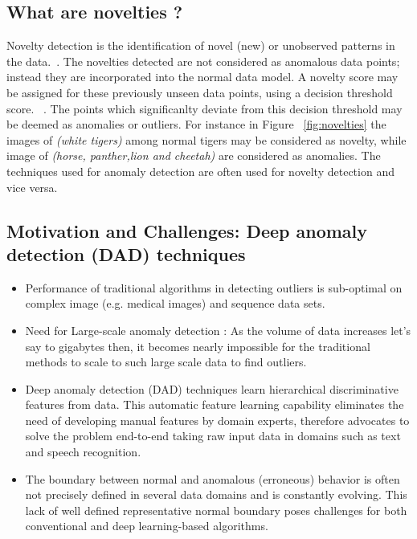 \subsection{What are novelties ?}
Novelty detection is the identification of novel (new) or unobserved patterns in the data.~\cite{miljkovic2010review}. The novelties detected are not considered as anomalous data points; instead they are incorporated into the normal data model. A novelty score may be assigned for these previously unseen data points, using a decision threshold score. ~\cite{pimentel2014review}.  The points which significanlty deviate from this decision threshold may be deemed as anomalies or outliers. For instance in Figure ~\ref{fig:novelties}  the images of \textit{(white tigers)} among normal tigers may be considered as novelty, while image of \textit{(horse, panther,lion and cheetah)} are considered as anomalies.
The techniques used for anomaly detection are often used for novelty detection and vice versa.



\subsection{Motivation and Challenges: Deep anomaly detection (DAD) techniques}
\begin{itemize}
\item Performance of traditional algorithms in detecting outliers is sub-optimal on complex image (e.g. medical images) and sequence data sets.
\item  Need for Large-scale anomaly detection : As the volume of data increases let's say to gigabytes then, it becomes nearly impossible for the traditional methods to scale to such large scale data to find outliers.
\item  Deep anomaly detection (DAD) techniques learn hierarchical discriminative features from data. This automatic feature learning capability eliminates the need of developing manual features by domain experts, therefore advocates to solve the problem end-to-end taking raw input data in domains such as text and speech recognition.
\item The boundary between normal and anomalous (erroneous) behavior is often not precisely defined  in several data domains and is constantly evolving. This lack of well defined representative normal boundary poses challenges for both conventional and deep learning-based algorithms.
\end{itemize}

